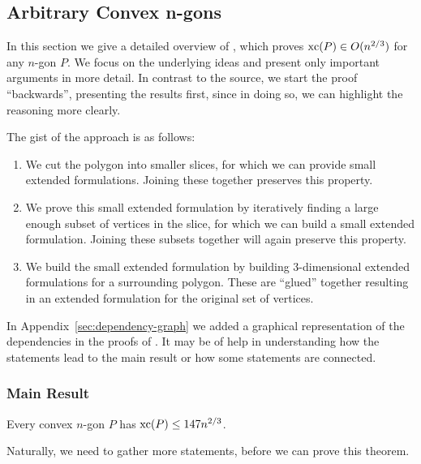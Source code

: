\subsection{Arbitrary Convex n-gons}

In this section we give a detailed overview of \cite{shitov2020sublinear}, which proves $\operatorname{xc}(P) \in O(n^{2/3})$ for any $n$-gon $P$.
We focus on the underlying ideas and present only important arguments in more detail. In contrast to the source, we start the proof ``backwards'', presenting  the results first, since in doing so, we can highlight the reasoning more clearly.

The gist of the approach is as follows:
\begin{enumerate}
  \item We cut the polygon into smaller slices, for which we can provide small extended formulations. Joining these together preserves this property.
  \item We prove this small extended formulation by iteratively finding a large enough subset of vertices in the slice, for which we can build a small extended formulation. Joining these subsets together will again preserve this property.
  \item We build the small extended formulation by building 3-dimensional extended formulations for a surrounding polygon. These are ``glued'' together resulting in an extended formulation for the original set of vertices.
\end{enumerate}

In Appendix~\ref{sec:dependency-graph} we added a graphical representation of the dependencies in the proofs of \cite{shitov2014sublinear}. It may be of help in understanding how the statements lead to the main result or how some statements are connected.



\subsubsection{Main Result}

\begin{theorem}\label{theorem:xc}
  Every convex $n$-gon $P$ has $\operatorname{xc}(P) \leq 147 n^{2/3}$.
\end{theorem}

Naturally, we need to gather more statements, before we can prove this theorem.

